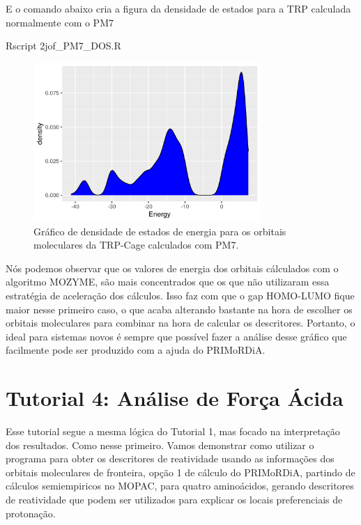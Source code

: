 \documentclass[a4paper,11pt]{refart}
\begin{document}
E o comando abaixo cria a figura da densidade de estados para a TRP calculada normalmente com o PM7

\hspace*{-\leftmarginwidth}
\begin{minipage}{\fullwidth}
	\begin{commandshell}Rscript 2jof_PM7_DOS.R\end{commandshell}
\end{minipage}


\hspace*{-\leftmarginwidth}
\begin{minipage}{\fullwidth}
	\begin{figure}[H]
		\begin{center}
			\includegraphics[width=3.4in]{images/tut3_img32}
			\caption{Gráfico de densidade de estados de energia para os orbitais moleculares da TRP-Cage calculados com PM7.}
			\label{fig_tut3_31}
		\end{center}
	\end{figure}
\end{minipage}

Nós podemos observar que os valores de energia dos orbitais cálculados com o algoritmo MOZYME, são mais concentrados que os que não utilizaram essa estratégia de aceleração dos cálculos. Isso faz com que o gap HOMO-LUMO fique maior nesse primeiro caso, o que acaba alterando bastante na hora de escolher os orbitais moleculares para combinar na hora de calcular os descritores. Portanto, o ideal para sistemas novos é sempre que possível fazer a análise desse gráfico que facilmente pode ser produzido com a ajuda do PRIMoRDiA.   

\newpage
\section{Tutorial 4: Análise de Força Ácida}

Esse tutorial segue a mesma lógica do Tutorial 1, mas focado na interpretação dos resultados. Como nesse primeiro. Vamos demonstrar como utilizar o programa para obter os descritores de reatividade usando as informações dos orbitais moleculares de fronteira, opção 1 de cálculo do PRIMoRDiA, partindo de cálculos semiempiricos no MOPAC, para quatro aminoácidos,  gerando descritores de reatividade que podem ser utilizados para explicar os locais preferenciais de protonação.
\end{document}

